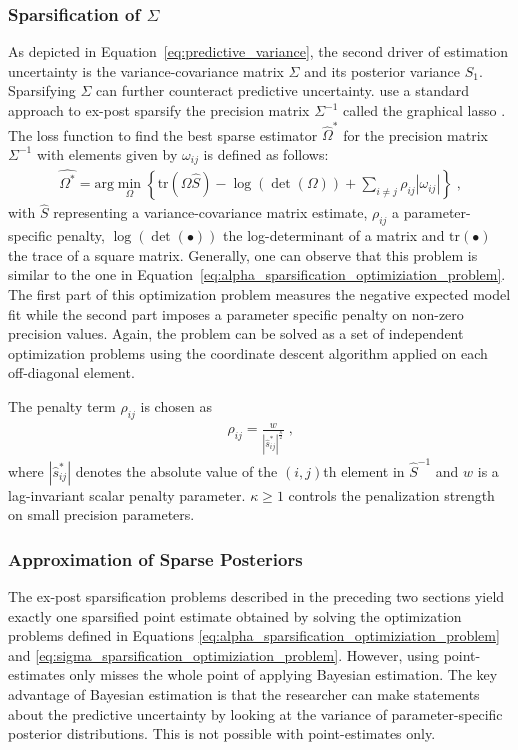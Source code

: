 \subsubsection{Sparsification of \texorpdfstring{$\Sigma$}{Sigma}}
\label{subsubsec:sparsification_sigma}
As depicted in Equation~\eqref{eq:predictive_variance}, the second driver of estimation uncertainty is the variance-covariance matrix $\Sigma$ and its posterior variance $S_1$. Sparsifying $\Sigma$ can further counteract predictive uncertainty. \textcite{hauzenberger_combining_2021} use a standard approach to ex-post sparsify the precision matrix $\Sigma^{-1}$ called the graphical lasso \parencite{friedman_sparse_2008,bashir_post-processing_2019}. The loss function to find the best sparse estimator $\hat{\Omega}^*$ for the precision matrix $\Sigma^{-1}$ with elements given by $\omega_{ij}$ is defined as follows:
\begin{align}
    \label{eq:sigma_sparsification_optimiziation_problem}
    \hat{\Omega^*} = \text{arg} \min_{\Omega} \left\{ \text{tr}(\Omega \hat{S}) - \log(\det(\Omega)) + \sum_{i \neq j} \rho_{ij} | \omega_{ij} | \right\} \; \text{,}
\end{align}
with $\hat{S}$ representing a variance-covariance matrix estimate, $\rho_{ij}$ a parameter-specific penalty, $\log(\det(\bullet))$ the log-determinant of a matrix and $\text{tr}(\bullet)$ the trace of a square matrix. Generally, one can observe that this problem is similar to the one in Equation~\eqref{eq:alpha_sparsification_optimiziation_problem}. The first part of this optimization problem measures the negative expected model fit while the second part imposes a parameter specific penalty on non-zero precision values. Again, the problem can be solved as a set of independent optimization problems using the coordinate descent algorithm applied on each off-diagonal element.

The penalty term $\rho_{ij}$ is chosen as
\begin{align}
    \rho_{ij} = \frac{w}{|\hat{s}^*_{ij}|^{\frac{\kappa}{2}}} \; \text{,}
\end{align}
where $|\hat{s}^*_{ij}|$ denotes the absolute value of the $(i, j)$th element in $\hat{S}^{-1}$ and $w$ is a lag-invariant scalar penalty parameter. $\kappa \geq 1$ controls the penalization strength on small precision parameters.

\subsubsection{Approximation of Sparse Posteriors}
\label{subsubsec:approximation_of_sparse_posteriors}
The ex-post sparsification problems described in the preceding two sections yield exactly one sparsified point estimate obtained by solving the optimization problems defined in Equations \eqref{eq:alpha_sparsification_optimiziation_problem} and \eqref{eq:sigma_sparsification_optimiziation_problem}. However, using point-estimates only misses the whole point of applying Bayesian estimation. The key advantage of Bayesian estimation is that the researcher can make statements about the predictive uncertainty by looking at the variance of parameter-specific posterior distributions. This is not possible with point-estimates only.

